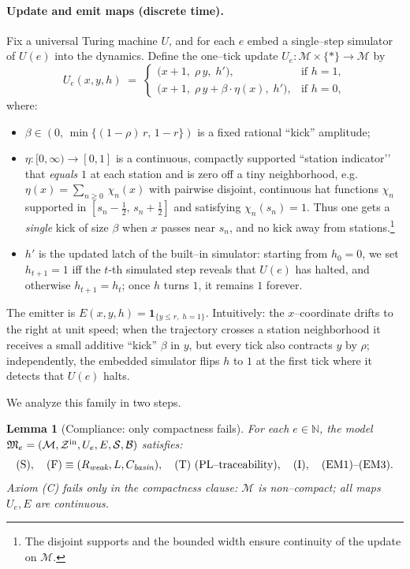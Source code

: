 \documentclass[12pt]{article}
\theoremstyle{definition}
\theoremstyle{plain}
\newtheorem{lemma}{Lemma}[section]
\begin{document}
\paragraph{Update and emit maps (discrete time).}
Fix a universal Turing machine \(U\), and for each \(e\) embed a single–step
simulator of \(U(e)\) into the dynamics.  Define the one–tick update
\(U_e:\mathcal M\times\{\ast\}\to\mathcal M\) by
\[
  U_e(x,y,h) \;=\;
  \begin{cases}
    \bigl(x+1,\;\rho\,y,\;h'\bigr), 
      & \text{if } h=1,\\[2pt]
    \bigl(x+1,\;\rho\,y + \beta\cdot \eta(x),\;h'\bigr),
      & \text{if } h=0,
  \end{cases}
\]
where:
\begin{itemize}
  \item \(\beta\in(0,\,\min\{(1-\rho)\,r,\,1-r\})\) is a fixed rational “kick” amplitude;
  \item \(\eta:[0,\infty)\to[0,1]\) is a continuous, compactly supported
        “station indicator’’ that \emph{equals} \(1\) at each station and is zero off
        a tiny neighborhood, e.g.
        \(
          \eta(x)=\sum_{n\ge0}\,\chi_n(x)
        \)
        with pairwise disjoint, continuous hat functions \(\chi_n\) supported in
        \([s_n-\tfrac12,\,s_n+\tfrac12]\) and satisfying \(\chi_n(s_n)=1\).
        Thus one gets a \emph{single} kick of size \(\beta\) when \(x\) passes near
        \(s_n\), and no kick away from stations.\footnote{The disjoint supports
        and the bounded width ensure continuity of the update on \(\mathcal M\).}
  \item \(h'\) is the updated latch of the built–in simulator:
        starting from \(h_0=0\), we set \(h_{t+1}=1\) iff the \(t\)-th simulated
        step reveals that \(U(e)\) has halted, and otherwise \(h_{t+1}=h_t\);
        once \(h\) turns \(1\), it remains \(1\) forever.
\end{itemize}
The emitter is \(E(x,y,h)=\mathbf 1_{\{y\le r,\;h=1\}}\).
Intuitively: the \(x\)–coordinate drifts to the right at unit speed; when the
trajectory crosses a station neighborhood it receives a small additive “kick”
\(\beta\) in \(y\), but every tick also contracts \(y\) by \(\rho\); independently,
the embedded simulator flips \(h\) to \(1\) at the first tick where it detects
that \(U(e)\) halts.

\medskip
We analyze this family in two steps.

\begin{lemma}[Compliance: only compactness fails]
\label{lem:C-only-compliance}
For each \(e\in\mathbb N\), the model
\(\mathfrak M_e=(\mathcal M,\mathcal Z^{\rm in},U_e,E,\mathcal S,\mathcal B)\)
satisfies:
\[
  \textup{(S)},\quad
  \textup{(F)}\equiv(R_{\text{\em weak}},L,C_{\text{\em basin}}),\quad
  \textup{(T)}\text{ (PL–traceability)},\quad
  \textup{(I)},\quad
  \textup{(EM1)}\text{--}\textup{(EM3)}.
\]
Axiom \textup{(C)} fails \emph{only} in the compactness clause:
\(\mathcal M\) is non–compact; all maps \(U_e,E\) are continuous.
\end{lemma}
\end{document}
